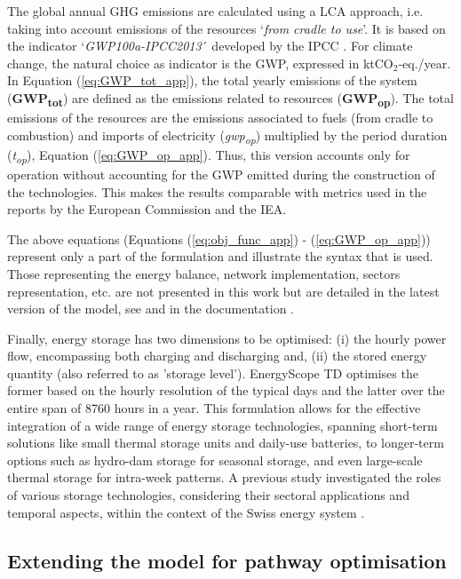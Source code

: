  
The global annual \gls{GHG} emissions are calculated using a \gls{LCA} approach, i.e. taking into account emissions of the resources `\emph{from cradle to use}'. It is based on the indicator `\emph{GWP100a-IPCC2013}´ developed by the \acrfull{IPCC} \cite{IPCC2014}. For climate change, the natural choice as indicator is the \acrlong{GWP}, expressed in ktCO$_2$-eq./year. In Equation (\ref{eq:GWP_tot_app}), the total yearly emissions  of the system (\textbf{GWP\textsubscript{tot}}) are defined as the emissions related to resources (\textbf{GWP\textsubscript{op}}). The total emissions of the resources are the emissions associated to fuels (from cradle to combustion) and imports of electricity (\emph{gwp\textsubscript{op}}) multiplied by the period duration  (\emph{t\textsubscript{op}}), Equation (\ref{eq:GWP_op_app}).
Thus, this version accounts only for operation without accounting for the \gls{GWP} emitted during the construction of the technologies. This makes the results comparable with metrics used in the reports by the European Commission and the \acrfull{IEA}.


The above equations (Equations (\ref{eq:obj_func_app}) - (\ref{eq:GWP_op_app})) represent only a part of the formulation and illustrate the syntax that is used. Those representing the energy balance, network implementation, sectors representation, etc. are not presented in this work but are detailed in the latest version of the model, see \cite{limpens2021generating} and in the documentation \cite{readthedocs_estd_v2.2}. 

Finally, energy storage has two dimensions to be optimised: (i) the hourly power flow, encompassing both charging and discharging and, (ii) the stored energy quantity (also referred to as 'storage level'). EnergyScope TD optimises the former based on the hourly resolution of the typical days and the latter over the entire span of 8760 hours in a year. This formulation allows for the effective integration of a wide range of energy storage technologies, spanning short-term solutions like small thermal storage units and daily-use batteries, to longer-term options such as hydro-dam storage for seasonal storage, and even large-scale thermal storage for intra-week patterns. A previous study investigated the roles of various storage technologies, considering their sectoral applications and temporal aspects, within the context of the Swiss energy system \cite{Limpens_role_2019}.

\subsection{Extending the model for pathway optimisation}
\label{sec:path_methodo}

